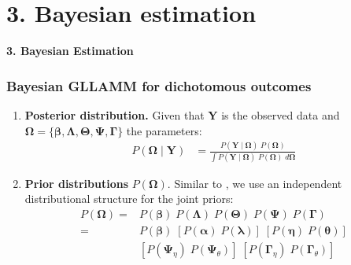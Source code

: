 \documentclass[nonav,sleutel]{beamer}
\begin{document}
	\section{3. Bayesian estimation}
	\begin{frame}
		\LARGE{\textbf{3. Bayesian Estimation}}
	\end{frame}
	\begin{frame}
		\frametitle{Bayesian GLLAMM for dichotomous outcomes}
		\begin{enumerate}
			\item \textbf{Posterior distribution.}
			Given that $\mathbf{Y}$ is the observed data and $\pmb{\Omega} = \{ \pmb{\beta}, \pmb{\Lambda}, \pmb{\Theta}, \pmb{\Psi}, \pmb{\Gamma} \}$ the parameters:
			\begin{equation} \label{eq:posterior1}
				\begin{split}
					P(\pmb{\Omega} \; | \; \mathbf{Y}) &= \frac{ P( \mathbf{Y} \; | \; \pmb{\Omega} ) \; P( \pmb{\Omega} ) }{ \int P( \mathbf{Y} \; | \; \pmb{\Omega} ) \; P( \pmb{\Omega} ) \; d\pmb{\Omega} }
				\end{split}
			\end{equation}
			\item \textbf{Prior distributions} $P(\pmb{\Omega})$.
			Similar to \citet{Patz_et_al_1999}, we use an independent distributional structure for the joint priors:
			\begin{equation}
				\begin{split}
					P( \pmb{\Omega} ) =& P( \pmb{\beta} ) \; P( \pmb{\Lambda} ) \; P( \pmb{\Theta} ) \; P( \pmb{\Psi} ) \; P( \pmb{\Gamma}) \\
					=& P( \pmb{\beta} ) \; \left[ P( \pmb{\alpha} ) \; P( \pmb{\lambda} ) \right] \; \left[ P( \pmb{\eta} ) \; P( \pmb{\theta} ) \right] \\
					& \left[ P( \pmb{\Psi}_{\eta} ) \; P( \pmb{\Psi}_{\theta} ) \right] \; \left[ P( \pmb{\Gamma}_{\eta} ) \; P( \pmb{\Gamma}_{\theta} ) \right]
				\end{split}
			\end{equation}
		\end{enumerate}
	\end{frame}
\end{document}
